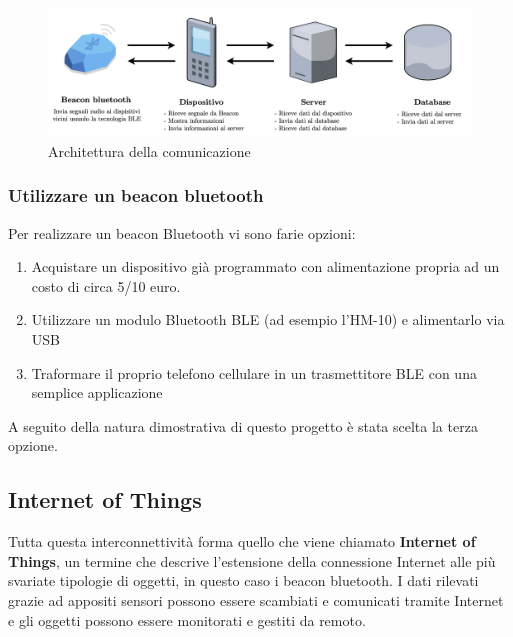 \begin{center}
\begin{figure}[htp]
    \centering
    \includegraphics[width=15cm]{diagrams/diagramma_comunicazione.png}
    \caption{Architettura della comunicazione}
    \label{fig:architettura_comunicazione}
\end{figure}
\end{center}

\subsubsection{Utilizzare un beacon bluetooth}
Per realizzare un beacon Bluetooth vi sono farie opzioni:
\begin{enumerate}
    \item Acquistare un dispositivo già programmato con alimentazione propria ad un costo di circa 5/10 euro.
    \item Utilizzare un modulo Bluetooth BLE (ad esempio l'HM-10) e alimentarlo via USB
    \item Traformare il proprio telefono cellulare in un trasmettitore BLE con una semplice applicazione
\end{enumerate}

A seguito della natura dimostrativa di questo progetto è stata scelta la terza opzione.

\subsection{Internet of Things} Tutta questa interconnettività forma quello che viene chiamato \textbf{Internet of Things}, un termine che descrive l'estensione della connessione Internet alle più svariate tipologie di oggetti, in questo caso i beacon bluetooth. I dati rilevati grazie ad appositi sensori possono essere scambiati e comunicati tramite Internet e gli oggetti possono essere monitorati e gestiti da remoto.



